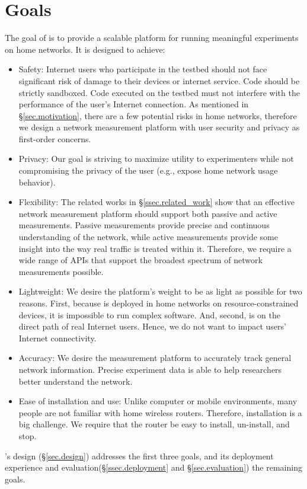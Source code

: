 \section{Goals}
\label{ssec.goals}
The goal of \sysname is to provide a scalable platform for running meaningful experiments on home networks. It is designed to achieve:
\begin{itemize}
\item Safety: Internet users who participate in the testbed should not face significant risk of damage to their devices or internet service. Code should be strictly sandboxed. Code executed on the testbed must not interfere with the performance of the user's Internet connection. As mentioned in \S{\ref{sec.motivation}}, there are a few potential risks in home networks, therefore we design a network measurement platform with user security and privacy as first-order concerns.

\item Privacy: Our goal is striving to maximize utility to experimenters while not compromising the privacy of the user (e.g., expose home network usage behavior).

\item Flexibility: The related works in \S{\ref{ssec.related_work}} show that an effective network measurement platform should support both passive and active measurements. Passive measurements provide precise and continuous understanding of the network, while active measurements provide some insight into the way real traffic is treated within it. Therefore, we require a wide range of APIs that support the broadest spectrum of network measurements possible.

\item Lightweight: We desire the platform's weight to be as light as possible for two reasons. First, because \sysname is deployed in home networks on resource-constrained devices, it is impossible to run complex software. And, second,  \sysname is on the direct path of real Internet users. Hence, we do not want to impact users' Internet connectivity.

\item Accuracy: We desire the measurement platform to accurately track 
general network information. Precise experiment data is able to help researchers better understand the network.

\item Ease of installation and use: Unlike computer or mobile environments, many people are not familiar with home wireless routers. Therefore, installation is a big challenge. We require that the router be easy to install, un-install, and stop.
\end{itemize}

\sysname's design (\S\ref{sec.design}) addresses the first three goals, and its deployment experience and evaluation(\S\ref{ssec.deployment} and \S\ref{sec.evaluation}) the remaining goals.